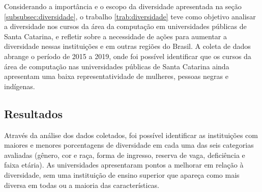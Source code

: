 \documentclass[12pt]{article}
\begin{document}
Considerando a importância e o escopo da diversidade apresentada na seção \ref{subsubsec:diversidade}, o trabalho \ref{trab:diversidade} teve como objetivo analisar a diversidade nos cursos da área da computação em universidades públicas de Santa Catarina, e refletir sobre a necessidade de ações para aumentar a diversidade nessas instituições e em outras regiões do Brasil. A coleta de dados abrange o período de 2015 a 2019, onde foi possível identificar que os cursos da área de computação nas universidades públicas de Santa Catarina ainda apresentam uma baixa representatividade de mulheres, pessoas negras e indígenas.




\subsection{Resultados}

Através da análise dos dados coletados, foi possível identificar as instituições com maiores e menores porcentagens de diversidade em cada uma das seis categorias avaliadas (gênero, cor e raça, forma de ingresso, reserva de vaga, deficiência e faixa etária). As universidades apresentaram pontos a melhorar em relação à diversidade, sem uma instituição de ensino superior que apareça como mais diversa em todas ou a maioria das características.


\end{document}
